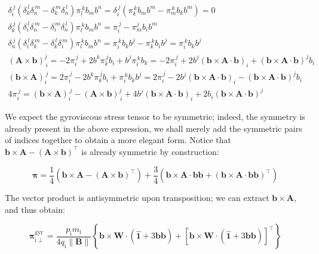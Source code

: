 \begin{gather*}
    \delta_i^{\,j}\left(\delta_k^{\,l}\delta_n^{\,m}-\delta_k^{\,m}\delta_n^{\,l}\right)\pi_{l}^{\,k}b_m b^n=\delta_i^{\,j}\left(\pi_k^{\,k}b_m b^{m}-\pi_m^{\,k}b_kb^{m}\right)=0\\
    \delta_k^{\,j}(\delta_i^{\,l}\delta_n^{\,m} - \delta_i^{\,m}\delta_n^{\,l})\pi_{l}^{\,k}b_m b^n=\pi_i^{\,j}-\pi_m^jb_ib^m\\
    \delta_n^{\,j}(\delta_i^{\,l}\delta_k^{\,m} - \delta_k^{\,l}\delta_i^{\,m})\pi_l^{\,k}b_mb^n=\pi_i^{\,k}b_kb^j-\pi_k^{\,k}b_i b^j=\pi_i^{\,k}b_kb^j\\
    (\mathbf{A}\times \mathbf{b})_{\,i}^{j}=-2\pi_i^{\,j}+2b^k\pi_k^{\,j}b_i+b^j\pi_i^{\,k}b_k=-2\pi_i^{\,j}+2b^j\left(\mathbf{b}\times \mathbf{A}\cdot \mathbf{b}\right)_i+\left(\mathbf{b}\times \mathbf{A}\cdot \mathbf{b}\right)^jb_i\\
    (\mathbf{b}\times \mathbf{A})_i^{\,j}=2\pi_i^{\,j}-2b^k\pi_k^{\,j}b_i+\pi_i^{\,k}b_kb^j=2\pi_i^{\,j}-2b^j \left(\mathbf{b}\times \mathbf{A}\cdot \mathbf{b}\right)_i - \left(\mathbf{b} \times \mathbf{A}\cdot \mathbf{b}\right)^jb_i\\
    4\pi_i^{\,j}=(\mathbf{b}\times \mathbf{A})_i^{\,j}-\left(\mathbf{A} \times \mathbf{b}\right)^j_{\,i}+4b^j \left(\mathbf{b}\times \mathbf{A} \cdot \mathbf{b}\right)_{i}+2b_i\left(\mathbf{b}\times \mathbf{A}\cdot \mathbf{b}\right)^j
\end{gather*}

We expect the gyroviscous stress tensor to be symmetric; indeed, the symmetry is already present in the above expression, we shall merely add the symmetric pairs of indices together to obtain a more elegant form. Notice that $\mathbf{b}\times \mathbf{A}-\left(\mathbf{A}\times \mathbf{b}\right)^\top$ is already symmetric by construction:

\begin{equation*}
    \boldsymbol{\pi}=\frac{1}{4}\left(\mathbf{b}\times \mathbf{A}-\left(\mathbf{A}\times \mathbf{b}\right)^\top\right)+\frac{3}{4}\left(\mathbf{b}\times \mathbf{A}\cdot \mathbf{b}\mathbf{b}+\left(\mathbf{b}\times \mathbf{A}\cdot \mathbf{b}\mathbf{b}\right)^\top\right)
\end{equation*}

The vector product is antisymmetric upon transposition; we can extract $\mathbf{b}\times \mathbf{A}$, and thus obtain:

\begin{equation}
    \label{comp-32}
    \boldsymbol{\pi}_{\mathrm{i}\perp}^{\mathrm{gyr}}=\frac{p_{\mathrm{i}}m_{\mathrm{i}}}{4 q_{\mathrm{i}}\|\mathbf{B}\|}\left\{\mathbf{b}\times \mathbf{W}\cdot \left(\mathbf{\hat{1}}+3 \mathbf{b}\mathbf{b}\right)+\left[\mathbf{b}\times \mathbf{W}\cdot \left(\mathbf{\hat{1}}+3 \mathbf{b}\mathbf{b}\right)\right]^\top\right\}
\end{equation}

